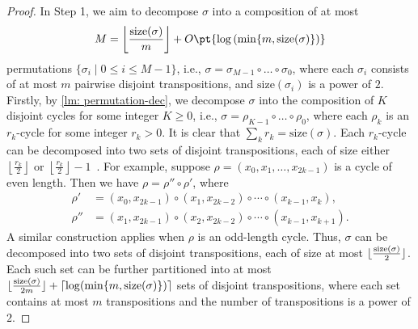 \documentclass[a4paper,UKenglish,cleveref, autoref, thm-restate]{lipics-v2021}
\DeclarePairedDelimiter\ceil{\lceil}{\rceil}
\DeclarePairedDelimiter\floor{\lfloor}{\rfloor}
\newcommand{\bo}{O\pt}
\begin{document}
\begin{proof}
In Step 1, we aim to decompose $\sigma$ into a composition of at most
\begin{align}
    M = \left\lfloor \frac{\mathrm{size}(\sigma)}{m} \right\rfloor + \bo{\log \left(\min\{m, \mathrm{size}(\sigma)\}\right)}
\end{align}
permutations $\{\sigma_i \mid 0 \leq i \leq M-1\}$, i.e., $\sigma = \sigma_{M-1} \circ \dots \circ \sigma_0$, where each $\sigma_i$ consists of at most $m$ pairwise disjoint transpositions, and $\mathrm{size}(\sigma_i)$ is a power of $2$.
Firstly, by \cref{lm: permutation-dec}, we decompose $\sigma$ into the composition of $K$ disjoint cycles for some integer $K \geq 0$, i.e., $\sigma = \rho_{K-1} \circ \dots \circ \rho_0$, where each $\rho_k$ is an $r_k$-cycle for some integer $r_k > 0$. It is clear that $\sum_k r_k = \mathrm{size}(\sigma)$.
Each $r_k$-cycle can be decomposed into two sets of disjoint transpositions, each of size either $\left\lfloor \frac{r_k}{2} \right\rfloor$ or $\left\lfloor \frac{r_k}{2} \right\rfloor - 1$~\cite{moore2001parallel}. For example, suppose $\rho = (x_0, x_1, \dots, x_{2k-1})$ is a cycle of even length. Then we have $\rho = \rho'' \circ \rho'$, where
\begin{align}
    \rho' &= (x_0, x_{2k-1}) \circ (x_1, x_{2k-2}) \circ \cdots \circ (x_{k-1}, x_{k}), \\
    \rho'' &= (x_1, x_{2k-1}) \circ (x_2, x_{2k-2}) \circ \cdots \circ (x_{k-1}, x_{k+1}).
\end{align}
A similar construction applies when $\rho$ is an odd-length cycle.
Thus, $\sigma$ can be decomposed into two sets of disjoint transpositions, each of size at most $\floor{\frac{\mathrm{size}(\sigma)}{2}}$.
Each such set can be further partitioned into at most $\floor{\frac{\mathrm{size}(\sigma)}{2m}} + \ceil{\log (\min\{m, \mathrm{size}(\sigma)\})}$ sets of disjoint transpositions, where each set contains at most $m$ transpositions and the number of transpositions is a power of $2$.


\end{proof}
\end{document}
